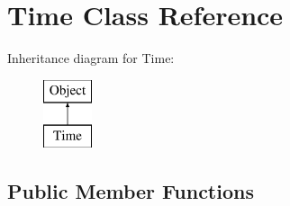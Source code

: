 \hypertarget{class_time}{\section{Time Class Reference}
\label{class_time}
}
Inheritance diagram for Time\-:\begin{figure}[H]
\begin{center}
\leavevmode
\includegraphics[height=2.000000cm]{class_time}
\end{center}
\end{figure}
\subsection*{Public Member Functions}
